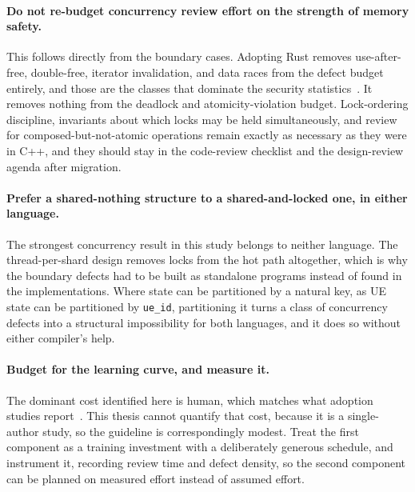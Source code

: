 \documentclass[english,oneside,a4paper,censored,csm,software-track-2020]{HYthesisML}
\begin{document}
\paragraph{Do not re-budget concurrency review effort on the strength of memory safety.}
This follows directly from the boundary cases. Adopting Rust removes use-after-free,
double-free, iterator invalidation, and data races from the defect budget entirely, and those
are the classes that dominate the security statistics~\cite{msrc2019memory,google2022android}.
It removes nothing from the deadlock and atomicity-violation budget. Lock-ordering discipline,
invariants about which locks may be held simultaneously, and review for
composed-but-not-atomic operations remain exactly as necessary as they were in C++, and they
should stay in the code-review checklist and the design-review agenda after migration.

\paragraph{Prefer a shared-nothing structure to a shared-and-locked one, in either language.}
The strongest concurrency result in this study belongs to neither language. The
thread-per-shard design removes locks from the hot path altogether, which is why the boundary
defects had to be built as standalone programs instead of found in the implementations.
Where state can be partitioned by a natural key, as UE state can be partitioned by
\texttt{ue\_id}, partitioning it turns a class of concurrency defects into a structural
impossibility for both languages, and it does so without either compiler's help.

\paragraph{Budget for the learning curve, and measure it.}
The dominant cost identified here is human, which matches what adoption studies
report~\cite{fulton2021adopting}. This thesis cannot quantify that cost, because it is a
single-author study, so the guideline is correspondingly modest. Treat the first component as
a training investment with a deliberately generous schedule, and instrument it, recording
review time and defect density, so the second component can be planned on measured effort
instead of assumed effort.
\end{document}
